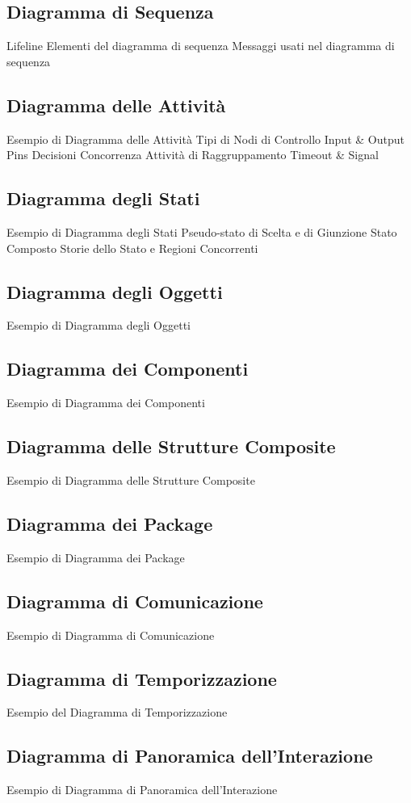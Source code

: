 \documentclass{article}
\begin{document}
	\subsection{Diagramma di Sequenza}
	Lifeline
	Elementi del diagramma di sequenza
	Messaggi usati nel diagramma di sequenza
	\subsection{Diagramma delle Attività}
	Esempio di Diagramma delle Attività
	Tipi di Nodi di Controllo
	Input \& Output Pins
	Decisioni
	Concorrenza
	Attività di Raggruppamento
	Timeout \& Signal
	\subsection{Diagramma degli Stati}
	Esempio di Diagramma degli Stati
	Pseudo-stato di Scelta e di Giunzione
	Stato Composto
	Storie dello Stato e Regioni Concorrenti
	\subsection{Diagramma degli Oggetti}
	Esempio di Diagramma degli Oggetti
	\subsection{Diagramma dei Componenti}
	Esempio di Diagramma dei Componenti
	\subsection{Diagramma delle Strutture Composite}
	Esempio di Diagramma delle Strutture Composite
	\subsection{Diagramma dei Package}
	Esempio di Diagramma dei Package
	\subsection{Diagramma di Comunicazione}
	Esempio di Diagramma di Comunicazione
	\subsection{Diagramma di Temporizzazione}
	Esempio del Diagramma di Temporizzazione
	\subsection{Diagramma di Panoramica dell’Interazione}
	Esempio di Diagramma di Panoramica dell’Interazione
\end{document}
